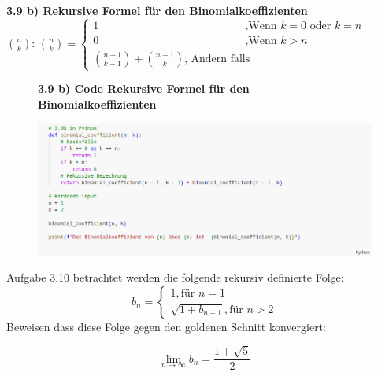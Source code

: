 \documentclass{beamer}
\begin{document}
\begin{frame}

\noindent \textbf{3.9 b) Rekursive Formel für den Binomialkoeffizienten } \\

$ \binom{n}{k} $:
$\binom{n}{k} = \begin{cases}
    1     \text{ } \text{ } \text{ } \text{ } \text{ }
    \text{ } \text{ } \text{ } \text{ } \text{ } 
    \text{ } \text{ } \text{ } \text{ } \text{ } 
    \text{ } \text{ } \text{ } \text{ } \text{ } 
    \text{,Wenn } k = 0 \text{ oder } k = n \\
    0     \text{ } \text{ } \text{ } \text{ } \text{ }
    \text{ } \text{ } \text{ } \text{ } \text{ } 
    \text{ } \text{ } \text{ } \text{ } \text{ } 
    \text{ } \text{ } \text{ } \text{ } \text{ }  
    \text{,Wenn } k > n \\
    \binom{n-1}{k -1} + \binom{n -1}{k}  
    \text{, Andern falls } 
\end{cases}$        
\end{frame}

\begin{frame}%
\begin{figure}
\noindent \textbf{3.9 b) Code Rekursive Formel für  den Binomialkoeffizienten} \\
    \begin{center}
        \includegraphics[width=1.3\textwidth]{code/aufg3.9.png}
    \end{center}

\end{figure}


\end{frame}

\begin{frame}{Aufgabe 3.10}
betrachtet werden die folgende rekursiv definierte Folge:
$$b_{n} =
\begin{cases} 
    1, \text{für  } n = 1 \\
    \sqrt{1 + b_{n-1}}, \text{für  } n > 2

\end{cases}$$
Beweisen dass diese Folge gegen den goldenen Schnitt konvergiert:

\[
\lim_{n \to \infty} b_{n}=\frac{1+ \sqrt{5}}{2}
\]
\end{frame}
\end{document}
